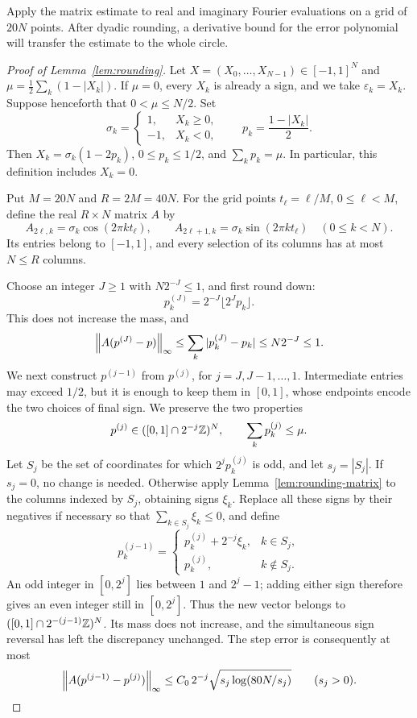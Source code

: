Apply the matrix estimate to real and imaginary Fourier evaluations on
a grid of $20N$ points.  After dyadic rounding, a derivative bound for
the error polynomial will transfer the estimate to the whole circle.

\begin{proof}[Proof of Lemma~\ref{lem:rounding}]
Let $X=(X_0,\ldots,X_{N-1})\in[-1,1]^N$ and
$\mu=\frac12\sum_k(1-|X_k|)$.  If $\mu=0$, every $X_k$ is already a
sign, and we take $\varepsilon_k=X_k$.  Suppose henceforth that
$0<\mu\le N/2$.  Set
\[
 \sigma_k=\begin{cases}1,&X_k\ge0,\\-1,&X_k<0,\end{cases}
 \qquad p_k=\frac{1-|X_k|}{2}.
\]
Then $X_k=\sigma_k(1-2p_k)$, $0\le p_k\le1/2$, and
$\sum_kp_k=\mu$.  In particular, this definition includes $X_k=0$.

Put $M=20N$ and $R=2M=40N$.  For the grid points
$t_\ell=\ell/M$, $0\le\ell<M$, define the real $R\times N$ matrix $A$ by
\[
 A_{2\ell,k}=\sigma_k\cos(2\pi kt_\ell),\qquad
 A_{2\ell+1,k}=\sigma_k\sin(2\pi kt_\ell)
 \quad(0\le k<N).
\]
Its entries belong to $[-1,1]$, and every selection of its columns has
at most $N\le R$ columns.

Choose an integer $J\ge1$ with $N2^{-J}\le1$, and first round down:
\[
 p^{(J)}_k=2^{-J}\lfloor2^Jp_k\rfloor.
\]
This does not increase the mass, and
\begin{equation}\label{eq:rounding-initial}
 \left\lVert A(p^{(J)}-p)\right\rVert_\infty
 \le\sum_k|p^{(J)}_k-p_k|\le N2^{-J}\le1.
\end{equation}
We next construct $p^{(j-1)}$ from $p^{(j)}$, for $j=J,J-1,\ldots,1$.
Intermediate entries may exceed $1/2$, but it is enough to keep them in
$[0,1]$, whose endpoints encode the two choices of final sign.  We
preserve the two properties
\[
 p^{(j)}\in([0,1]\cap2^{-j}\mathbb Z)^N,
 \qquad \sum_kp^{(j)}_k\le\mu.
\]
Let $S_j$ be the set of coordinates for which $2^jp^{(j)}_k$ is odd,
and let $s_j=|S_j|$.  If $s_j=0$, no change is needed.  Otherwise apply
Lemma~\ref{lem:rounding-matrix} to the columns indexed by $S_j$, obtaining
signs $\xi_k$.  Replace all these signs by their negatives if necessary
so that $\sum_{k\in S_j}\xi_k\le0$, and define
\[
 p^{(j-1)}_k=
 \begin{cases}
 p^{(j)}_k+2^{-j}\xi_k,&k\in S_j,\\
 p^{(j)}_k,&k\notin S_j.
 \end{cases}
\]
An odd integer in $[0,2^j]$ lies between $1$ and $2^j-1$; adding either
sign therefore gives an even integer still in $[0,2^j]$.  Thus the
new vector belongs to $([0,1]\cap2^{-(j-1)}\mathbb Z)^N$.  Its mass does not
increase, and the simultaneous sign reversal has left the discrepancy
unchanged.  The step error is consequently at most
\begin{equation}\label{eq:rounding-step}
 \left\lVert A(p^{(j-1)}-p^{(j)})\right\rVert_\infty
 \le C_0\,2^{-j}\sqrt{s_j\log(80N/s_j)}
 \qquad(s_j>0).
\end{equation}


\end{proof}
